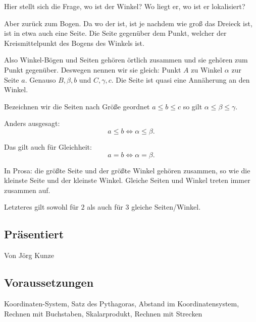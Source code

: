 \documentclass[a4paper]{amsart}
\theoremstyle{definition}
\begin{document}
Hier stellt sich die Frage, wo ist der Winkel? Wo liegt er, wo ist er lokalisiert?

Aber zurück zum Bogen. Da wo der ist, ist je nachdem wie groß das Dreieck ist, ist in etwa auch eine Seite. Die Seite gegenüber dem Punkt, welcher der Kreismittelpunkt des Bogens des Winkels ist.

Also Winkel-Bögen und Seiten gehören örtlich zusammen und sie gehören zum Punkt gegenüber. Deswegen nennen wir sie gleich: Punkt $A$ zu Winkel $\alpha$ zur Seite $a$. Genauso $B, \beta, b$ und $C, \gamma, c$. Die Seite ist quasi eine Annäherung an den Winkel.

Bezeichnen wir die Seiten nach Größe geordnet $a \le b \le c$ so gilt $\alpha \le \beta \le \gamma$.

Anders ausgesagt:
\begin{equation}\label{vergleich}
   a \le b \Leftrightarrow \alpha \le \beta.
\end{equation}

Das gilt auch für Gleichheit:
\begin{equation}\label{gleich}
   a = b \Leftrightarrow \alpha = \beta.
\end{equation}

In Prosa: die größte Seite und der größte Winkel gehören zusammen, so wie die kleinste Seite und der kleinste Winkel. Gleiche Seiten und Winkel treten immer zusammen auf.

Letzteres gilt sowohl für $2$ als auch für $3$ gleiche Seiten/Winkel.

\subsection*{Präsentiert}
Von Jörg Kunze

\subsection*{Voraussetzungen}
Koordinaten-System, Satz des Pythagoras, Abstand im Koordinatensystem, Rechnen mit Buchstaben, Skalarprodukt, Rechnen mit Strecken
\end{document}
